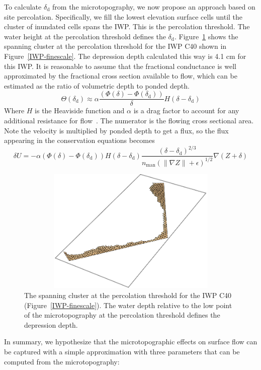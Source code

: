 \documentclass[review,11pt]{elsarticle}
\begin{document}
To calculate $\delta_\text{d}$ from the microtopography, we now propose an approach based on site percolation. Specifically, we fill the lowest elevation surface cells until the cluster of inundated cells spans the IWP. This is the percolation threshold. The water height at the percolation threshold defines the $\delta_\text{d}$. Figure~\ref{perc-cluster-poly40} shows the spanning cluster at the percolation threshold for the IWP C40 shown in Figure~\ref{IWP-finescale}. The depression depth calculated this way is 4.1 cm for this IWP.
It is reasonable to assume that the fractional conductance is well approximated by the fractional cross section available to flow, which can be estimated as the ratio of volumetric depth to ponded depth.
\begin{equation}
\Theta {(\delta_\text{d})} \approx \alpha \frac{( \Phi (\delta) - \Phi (\delta_\text{d}))} {\delta} H \left( \delta - \delta_\text{d}\right )
\end{equation}
Where $H$ is the Heaviside function and $\alpha$ is a drag factor to account for any additional resistance for flow~\cite{panday2004fully}. The numerator is the flowing cross sectional area. Note the velocity is multiplied by ponded depth to get a flux, so the flux appearing in the conservation equations becomes
\begin{equation}
 \delta U = - \alpha ( \Phi (\delta) - \Phi (\delta_\text{d})) H \left( \delta - \delta_\text{d}\right ) \frac{(\delta - \delta_\text{d})^{2/3}}{n_\text{man} (\| \nabla Z \| +\epsilon)^{1/2}} \nabla(Z + \delta)
\end{equation}
\begin{figure}
\centering
\includegraphics[width=12cm, height=6cm]{./figures/polygons-finescale/percolation-cluster-poly40.png}
\caption{The spanning cluster at the percolation threshold for the IWP C40 (Figure~\ref{IWP-finescale}). The water depth relative to the low point of the microtopography at the percolation threshold defines the depression depth.}
\label{perc-cluster-poly40}
\end{figure}
In summary, we hypothesize that the microtopographic effects on surface flow can be captured with a simple approximation with three parameters that can be computed from the microtopography:
\end{document}
